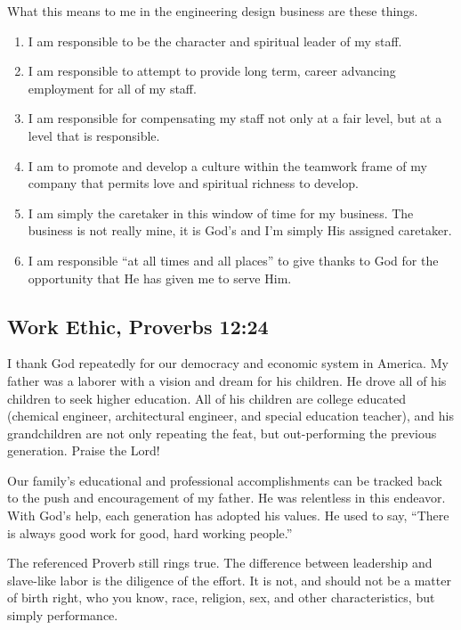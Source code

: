 \documentclass[12pt]{memoir}
\begin{document}
What this means to me in the engineering design business are these things.
\begin{enumerate}
\item I am responsible to be the character and spiritual leader of my staff.
\item I am responsible to attempt to provide long term, career advancing employment for all of my staff. 
\item I am responsible for compensating my staff not only at a fair level, but at a level that is responsible.
\item I am to promote and develop a culture within the teamwork frame of my company that permits love and spiritual richness to develop.
\item I am simply the caretaker in this window of time for my business. The business is not really mine, it is God's and I'm simply His
assigned caretaker.
\item I am responsible ``at all times and all places'' to give thanks
to God for the opportunity that He has given me to serve Him. 
\end{enumerate}

\subsection[Work Ethic]{Work Ethic, Proverbs 12:24}

I thank God repeatedly for our democracy and economic system in America.
My father was a laborer with a vision and dream for his children.
He drove all of his children to seek higher education.
All of his children are college educated (chemical engineer, architectural engineer, and special education teacher), and his grandchildren are not only repeating the feat, but out-performing the previous generation.
Praise the Lord!

Our family's educational and professional accomplishments can be tracked back to the push and encouragement of my father.
He was relentless in this endeavor.
With God's help, each generation has adopted his values.
He used to say, ``There is always good work for good, hard working people.'' 

The referenced Proverb still rings true.
The difference between leadership and slave-like labor is the diligence of the effort.
It is not, and should not be a matter of birth right, who you know, race,
religion, sex, and other characteristics, but simply performance.
\end{document}
